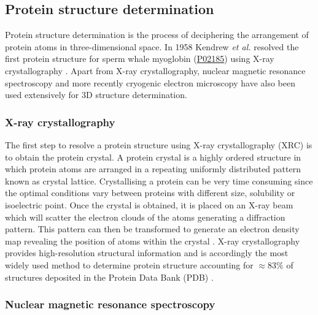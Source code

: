 \vspace{-13pt} %

\subsection{Protein structure determination}

Protein structure determination is the process of deciphering the arrangement of protein atoms in three-dimensional space. In 1958 Kendrew \textit{et al.} \cite{KENDREW_1958_MYOGLOBIN} resolved the first protein structure for sperm whale myoglobin (\href{https://www.uniprot.org/uniprotkb/P02185/entry}{P02185}) using X-ray crystallography \cite{BERNAL_1934_XRAY}. Apart from X-ray crystallography, nuclear magnetic resonance spectroscopy and more recently cryogenic electron microscopy have also been used extensively for 3D structure determination.

\subsubsection{X-ray crystallography}

The first step to resolve a protein structure using X-ray crystallography (XRC) is to obtain the protein crystal. A protein crystal is a highly ordered structure in which protein atoms are arranged in a repeating uniformly distributed pattern known as crystal lattice. Crystallising a protein can be very time consuming since the optimal conditions vary between proteins with different size, solubility or isoelectric point. Once the crystal is obtained, it is placed on an X-ray beam which will scatter the electron clouds of the atoms generating a diffraction pattern. This pattern can then be transformed to generate an electron density map revealing the position of atoms within the crystal \cite{FRIEDRICH_1913_XRAY, BRAGG_1913_XRAY}. X-ray crystallography provides high-resolution structural information and is accordingly the most widely used method to determine protein structure accounting for $\approx$83\% of structures deposited in the Protein Data Bank (PDB) \cite{BERMAN_2000_PDB}.

\subsubsection{Nuclear magnetic resonance spectroscopy}

